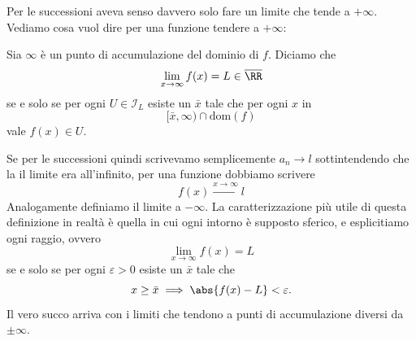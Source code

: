 \documentclass[11pt]{scrartcl}
\begin{document}
	Per le successioni aveva senso davvero solo fare un limite che tende a $+\infty$. Vediamo cosa vuol dire per una funzione tendere a $+\infty$:
	\begin{definition}
		Sia $\infty$ è un punto di accumulazione del dominio di $f$. Diciamo che 
		$$\lim_{x\to\infty}f(x)=L\in\overline{\RR}$$
		se e solo se per ogni $U\in \mathcal{I}_L$ esiste un $\bar{x}$ tale che per ogni $x$ in 
		$$[\bar{x},\infty)\cap \text{dom}(f)$$
		vale $f(x)\in U$.
	\end{definition}
	Se per le successioni quindi scrivevamo semplicemente $a_n\to l$ sottintendendo che la il limite era all'infinito, per una funzione dobbiamo scrivere
	$$f(x)\overset{x\to\infty}{\longrightarrow}l$$
	Analogamente definiamo il limite a $-\infty$. La caratterizzazione più utile di questa definizione in realtà è quella in cui ogni intorno è supposto sferico, e esplicitiamo ogni raggio, ovvero 
	$$\lim_{x\to\infty}f(x)=L$$
	se e solo se per ogni $\varepsilon>0$ esiste un $\bar{x}$ tale che
	$$x\ge \bar{x} \implies \abs{f(x)-L}<\varepsilon.$$
	Il vero succo arriva con i limiti che tendono a punti di accumulazione diversi da $\pm\infty$.
	
\end{document}
